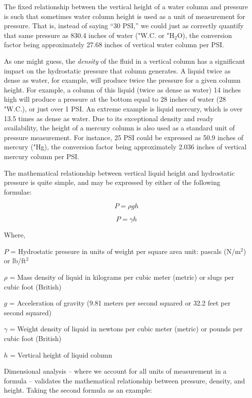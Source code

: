 The fixed relationship between the vertical height of a water column and pressure is such that sometimes water column height is used as a unit of measurement for pressure.  That is, instead of saying ``30 PSI,'' we could just as correctly quantify that same pressure as 830.4 inches of water ("W.C. or "H$_{2}$O), the conversion factor being approximately 27.68 inches of vertical water column per PSI. 

As one might guess, the \textit{density} of the fluid in a vertical column has a significant impact on the hydrostatic pressure that column generates.  A liquid twice as dense as water, for example, will produce twice the pressure for a given column height.  For example, a column of this liquid (twice as dense as water) 14 inches high will produce a pressure at the bottom equal to 28 inches of water (28 "W.C.), or just over 1 PSI.  An extreme example is liquid mercury, which is over 13.5 times as dense as water.  Due to its exceptional density and ready availability, the height of a mercury column is also used as a standard unit of pressure measurement.  For instance, 25 PSI could be expressed as 50.9 inches of mercury ("Hg), the conversion factor being approximately 2.036 inches of vertical mercury column per PSI. 

The mathematical relationship between vertical liquid height and hydrostatic pressure is quite simple, and may be expressed by either of the following formulae:

$$P = \rho g h$$

$$P = \gamma h$$

\noindent
Where,

$P$ = Hydrostatic pressure in units of weight per square area unit: pascals (N/m$^{2}$) or lb/ft$^{2}$ 

$\rho$ = Mass density of liquid in kilograms per cubic meter (metric) or slugs per cubic foot (British)

$g$ = Acceleration of gravity (9.81 meters per second squared or 32.2 feet per second squared)

$\gamma$ = Weight density of liquid in newtons per cubic meter (metric) or pounds per cubic foot (British)

$h$ = Vertical height of liquid column

\vskip 10pt

Dimensional analysis -- where we account for all units of measurement in a formula -- validates the mathematical relationship between pressure, density, and height.  Taking the second formula as an example:

